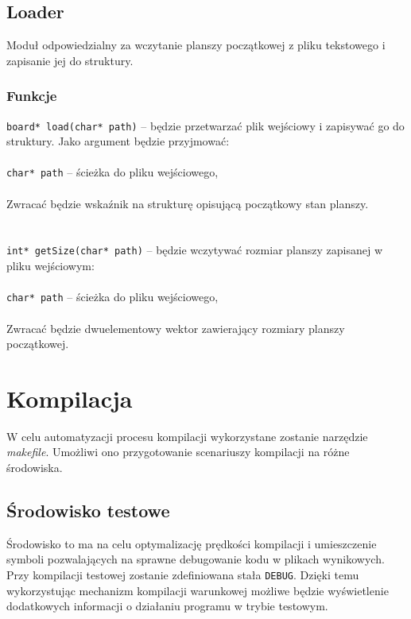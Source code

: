 \documentclass{article}
\begin{document}
\subsection{Loader}
Moduł odpowiedzialny za wczytanie planszy początkowej z pliku tekstowego i zapisanie jej do struktury.

\subsubsection{Funkcje}
\texttt{board* load(char* path)} -- będzie przetwarzać plik wejściowy i zapisywać go do struktury. Jako argument będzie przyjmować:\\\\
	 \hspace*{10mm}\texttt{char* path} -- ścieżka do pliku wejściowego,\\
\\
Zwracać będzie wskaźnik na strukturę opisującą początkowy stan planszy.\\\\
\\
\texttt{int* getSize(char* path)} -- będzie wczytywać rozmiar planszy zapisanej w pliku wejściowym:\\\\ %
	 \hspace*{10mm}\texttt{char* path} -- ścieżka do pliku wejściowego,\\
\\
Zwracać będzie dwuelementowy wektor zawierający rozmiary planszy początkowej.

\section{Kompilacja}
W celu automatyzacji procesu kompilacji wykorzystane zostanie narzędzie \textit{makefile}. Umożliwi ono przygotowanie scenariuszy kompilacji na różne środowiska.

\subsection{Środowisko testowe}
Środowisko to ma na celu optymalizację prędkości kompilacji i umieszczenie symboli pozwalających na sprawne debugowanie kodu w plikach wynikowych. Przy kompilacji testowej zostanie zdefiniowana stała \texttt{DEBUG}. Dzięki temu wykorzystując mechanizm kompilacji warunkowej możliwe będzie wyświetlenie dodatkowych informacji o działaniu programu w trybie testowym.
\end{document}

